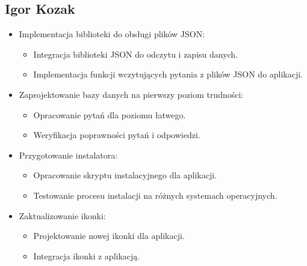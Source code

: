 \documentclass[]{article}
\begin{document}
\subsection{Igor Kozak}
	\begin{itemize}
		\item Implementacja biblioteki do obsługi plików JSON:
		\begin{itemize}
			\item Integracja biblioteki JSON do odczytu i zapisu danych.
			\item Implementacja funkcji wczytujących pytania z plików JSON do aplikacji.
		\end{itemize}
		\item Zaprojektowanie bazy danych na pierwszy poziom trudności:
		\begin{itemize}
			\item Opracowanie pytań dla poziomu łatwego.
			\item Weryfikacja poprawności pytań i odpowiedzi.
		\end{itemize}
		\item Przygotowanie instalatora:
		\begin{itemize}
			\item Opracowanie skryptu instalacyjnego dla aplikacji.
			\item Testowanie procesu instalacji na różnych systemach operacyjnych.
		\end{itemize}
		\item Zaktualizowanie ikonki:
		\begin{itemize}
			\item Projektowanie nowej ikonki dla aplikacji.
			\item Integracja ikonki z aplikacją.
	\end{itemize}
\end{itemize}
\end{document}
